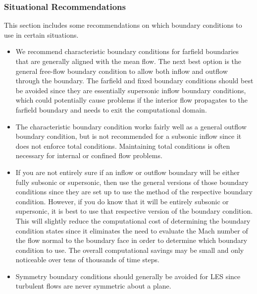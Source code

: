 
\subsubsection{Situational Recommendations}
\label{SEC:BC:Specify:Recommendations}

This section includes some recommendations on which boundary conditions to use
in certain situations.

\begin{itemize}
  \item
    We recommend characteristic boundary conditions for
    farfield boundaries that are generally aligned with the mean flow.
    The next best option is the general free-flow boundary
    condition to allow both inflow and outflow through the boundary.
    The farfield and fixed boundary conditions should best be avoided since
    they are essentially supersonic inflow boundary conditions, which could
    potentially cause problems if the interior flow propagates to the farfield
    boundary and needs to exit the computational domain.
  \item
    The characteristic boundary condition works fairly well as a general
    outflow boundary condition, but is not recommended for a subsonic inflow
    since it does not enforce total conditions.
    Maintaining total conditions is often necessary for internal or confined
    flow problems.
  \item
    If you are not entirely sure if an inflow or outflow boundary will be either
    fully subsonic or supersonic, then use the general versions
    of those boundary conditions since they are set up to use the 
    method of the respective boundary condition.
    However, if you do know that it will be entirely subsonic or supersonic,
    it is best to use that respective version of the boundary condition.
    This will slightly reduce the computational cost of determining the boundary
    condition states since it eliminates the need to evaluate the Mach number of
    the flow normal to the boundary face in order to determine which boundary
    condition to use.
    The overall computational savings may
    be small and only noticeable over tens of thousands of time steps.
  \item
    Symmetry boundary conditions should generally be avoided for LES since
    turbulent flows are never symmetric about a plane.

\end{itemize}
